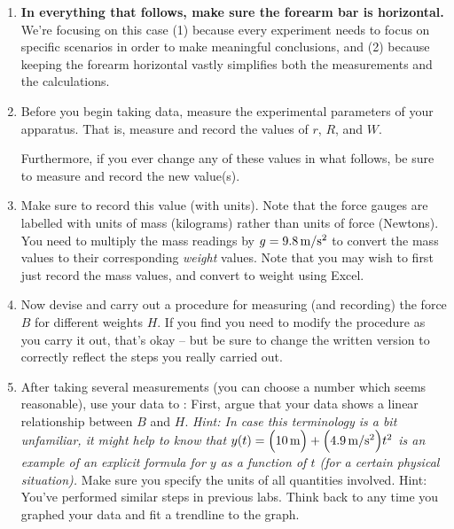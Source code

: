 \begin{enumerate}[series=labproc,label={\bf \arabic*.},
		ref=\textcolor{black}{\arabic*}]

\item
{\bf In everything that follows, make sure the forearm bar is horizontal.}
We're focusing on this case 
(1) because every experiment needs to focus on specific scenarios in order to 
make meaningful conclusions,
and (2) because keeping the forearm horizontal vastly simplifies both the
measurements and the calculations.

\item 
Before you begin taking data,
measure the experimental parameters of your apparatus.
That is, measure and record the values of $r$, $R$, and $W$.

Furthermore, if you ever change any of these values in what follows,
be sure to measure and record the new value(s).  


\item
{}
Make sure to record this value (with units).
Note that the force gauges are labelled with units of mass (kilograms) rather
than units of force (Newtons).  
You need to multiply the mass readings by $g=9.8\,\mathrm{m/s^2}$ 
to convert the mass values to
their corresponding \emph{weight} values.  Note that you may wish to first just
record the mass values, and convert to weight using Excel.

\item
Now devise and carry out a procedure for measuring (and recording)
the force $B$ for different weights $H$.  
If you find you need to modify the procedure as you carry it out,
that's okay -- but be sure to change the written version to correctly
reflect the steps you really carried out.

\item
After taking several measurements (you can choose a number which seems
reasonable), use your data to 
:
First, argue that your data shows a linear relationship between $B$ and $H$.
\emph{Hint:  In case this terminology is a bit unfamiliar, 
it might help to know that
$y(t) = \Bigl( 10\,\mathrm{m} \Bigr) +\Bigl( 4.9\,\mathrm{m/s^2} \Bigr)t^2$ 
is an example of an explicit formula 
for $y$ as a function of $t$ (for a certain physical situation).}
Make sure you specify the units of all quantities involved.
Hint:  You've performed similar steps in previous labs.
Think back to any time you graphed your data 
and fit a trendline to the graph.


\end{enumerate}

